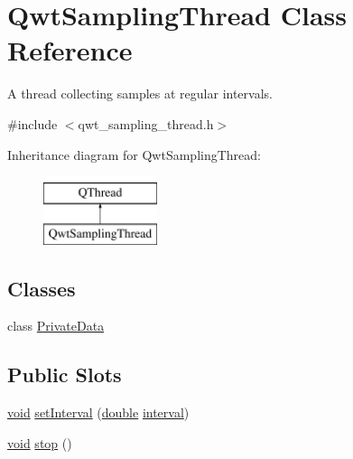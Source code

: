 \hypertarget{class_qwt_sampling_thread}{\section{Qwt\-Sampling\-Thread Class Reference}
\label{class_qwt_sampling_thread}
}


A thread collecting samples at regular intervals.  




{\ttfamily \#include $<$qwt\-\_\-sampling\-\_\-thread.\-h$>$}

Inheritance diagram for Qwt\-Sampling\-Thread\-:\begin{figure}[H]
\begin{center}
\leavevmode
\includegraphics[height=2.000000cm]{class_qwt_sampling_thread}
\end{center}
\end{figure}
\subsection*{Classes}
\begin{DoxyCompactItemize}
\item 
class \hyperlink{class_qwt_sampling_thread_1_1_private_data}{Private\-Data}
\end{DoxyCompactItemize}
\subsection*{Public Slots}
\begin{DoxyCompactItemize}
\item 
\hyperlink{group___u_a_v_objects_plugin_ga444cf2ff3f0ecbe028adce838d373f5c}{void} \hyperlink{class_qwt_sampling_thread_a36c56404ef0042cf52f1e592edf94f5d}{set\-Interval} (\hyperlink{_super_l_u_support_8h_a8956b2b9f49bf918deed98379d159ca7}{double} \hyperlink{class_qwt_sampling_thread_a4a2f5038c02c8cad5ebc1fae01480e73}{interval})
\item 
\hyperlink{group___u_a_v_objects_plugin_ga444cf2ff3f0ecbe028adce838d373f5c}{void} \hyperlink{class_qwt_sampling_thread_ac644ff417342617a39dbd86e50d09132}{stop} ()
\end{DoxyCompactItemize}
